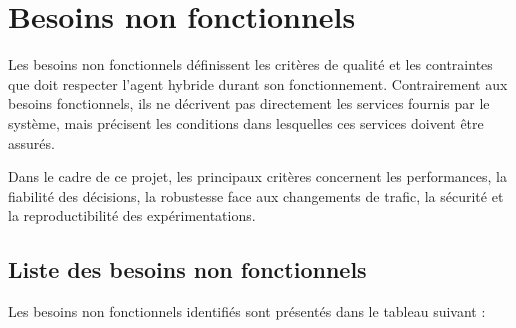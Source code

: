 \section{Besoins non fonctionnels}

Les besoins non fonctionnels définissent les critères de qualité
et les contraintes que doit respecter l'agent hybride durant
son fonctionnement. Contrairement aux besoins fonctionnels,
ils ne décrivent pas directement les services fournis par le
système, mais précisent les conditions dans lesquelles ces
services doivent être assurés.

Dans le cadre de ce projet, les principaux critères concernent
les performances, la fiabilité des décisions, la robustesse
face aux changements de trafic, la sécurité et la reproductibilité
des expérimentations.

\subsection{Liste des besoins non fonctionnels}

Les besoins non fonctionnels identifiés sont présentés dans
le tableau suivant :

